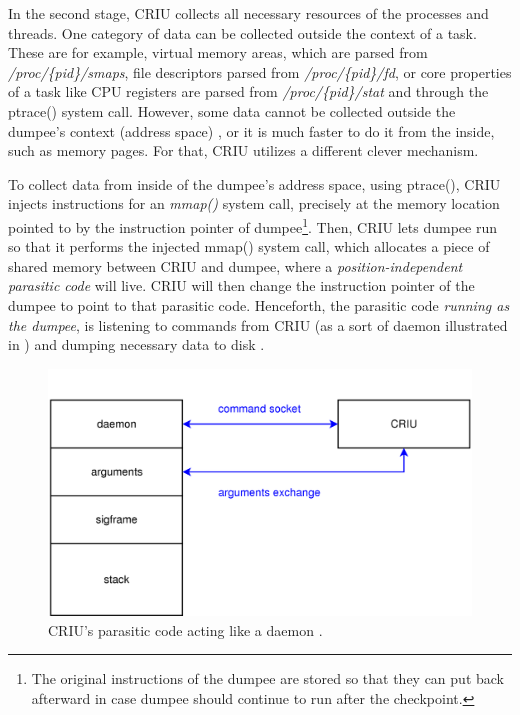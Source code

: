 \documentclass[
  digital,     %
  oneside,     %
  nosansbold,  %
  nocolorbold, %
  lof,         %
  lot,         %
]{fithesis4}
\begin{document}
In the second stage, CRIU collects all necessary resources of the processes and threads. One category of data can be collected outside the context of a task. These are for example, virtual memory areas, which are parsed from \emph{/proc/\{pid\}/smaps}, file descriptors parsed from \emph{/proc/\{pid\}/fd}, or core properties of a task like CPU registers are parsed from \emph{/proc/\{pid\}/stat} and through the ptrace() system call. However, some data cannot be collected outside the dumpee's context (address space) \cite{criu_cr}, or it is much faster to do it from the inside, such as memory pages. For that, CRIU utilizes a different clever mechanism.

To collect data from inside of the dumpee's address space, using ptrace(), CRIU injects instructions for an \emph{mmap()} system call, precisely at the memory location pointed to by the instruction pointer of dumpee\footnote{The original instructions of the dumpee are stored so that they can put back afterward in case dumpee should continue to run after the checkpoint.}. Then, CRIU lets dumpee run so that it performs the injected mmap() system call, which allocates a piece of shared memory between CRIU and dumpee, where a \emph{position-independent parasitic code} will live. CRIU will then change the instruction pointer of the dumpee to point to that parasitic code. Henceforth, the parasitic code \emph{running as the dumpee}, is listening to commands from CRIU (as a sort of daemon illustrated in ) and dumping necessary data to disk \cite{criu_parasite}.

\begin{figure}[H]
  \begin{center}
  \includegraphics[width=\textwidth]{figures/criu-parasite-daemon.png}
  \end{center}
  \caption{CRIU's parasitic code acting like a daemon \cite{criu_parasite}.}
  \label{fig:parasite-daemon}
\end{figure}
\end{document}
